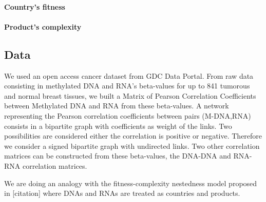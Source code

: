 \documentclass[10pt,a4paper]{article}
\begin{document}
\paragraph{Country's fitness}
\paragraph{Product's complexity}
\subsection{Data}
We used an open access cancer dataset from GDC Data Portal. From raw data consisting in methylated DNA and RNA's beta-values for up to 841 tumorous and normal breast tissues, we built a Matrix of Pearson Correlation Coefficients between Methylated DNA and RNA from these beta-values. A network representing the Pearson correlation coefficients between pairs (M-DNA,RNA) consists in a bipartite graph with coefficients as weight of the links. Two possibilities are considered either the correlation is positive or negative. Therefore we consider a signed bipartite graph with undirected links. Two other correlation matrices can be constructed from these beta-values, the DNA-DNA and RNA-RNA correlation matrices.

We are doing an analogy with the fitness-complexity nestedness model proposed in [citation] where DNAs and RNAs are treated as countries and products.
\end{document}
